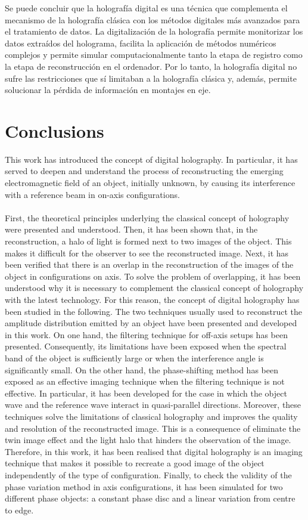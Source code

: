 \documentclass[12pt]{article}
\begin{document}
Se puede concluir que la holografía digital es una técnica   que complementa el mecanismo de la holografía clásica con los métodos  digitales más avanzados para el tratamiento de datos. La digitalización de la holografía  permite monitorizar los datos extraídos del holograma,   facilita la aplicación de  métodos numéricos complejos y permite simular computacionalmente tanto la etapa de registro como la etapa de reconstrucción en el ordenador. Por lo tanto, la holografía digital no sufre las restricciones que sí limitaban a la holografía clásica y, además, permite solucionar  la pérdida de información en montajes en eje.
\section*{Conclusions}
This work has introduced the concept of digital holography. In particular, it has served to deepen and understand the process of reconstructing the emerging electromagnetic field of an object, initially unknown, by causing its interference with a reference beam in on-axis configurations.\\ \\
First, the theoretical principles underlying the classical concept of holography were presented and understood. Then, it has been shown that, in the reconstruction, a halo of light is formed next to two images of the object. This makes it difficult for the observer to see the reconstructed image. Next, it has been verified that there is an overlap in the reconstruction of the images of the object in configurations on axis. To solve the problem of overlapping, it has been understood why it is necessary to complement the classical concept of holography with the latest technology. For this reason, the concept of digital holography has been studied in the following. The two techniques usually used to reconstruct the amplitude distribution emitted by an object have been presented and developed in this work. On one hand,  the filtering technique for off-axis setups has been presented. Consequently, its limitations have been exposed when the spectral band of the object is sufficiently large or when the interference angle is significantly small. On the other hand, the phase-shifting method has been exposed as an effective imaging technique when the filtering technique is not effective. In particular, it has been developed for the case in which the object wave and the reference wave interact  in quasi-parallel directions.  Moreover, these techniques solve the limitations of classical holography and improves the quality and resolution of the reconstructed image. This is a consequence of eliminate the twin image effect and the light halo that hinders the observation of the image. Therefore, in this work, it has been realised that digital holography is an imaging technique that makes it possible to recreate a good image of the object independently of the type of configuration. Finally, to check the validity of the phase variation method in axis configurations, it has been simulated for two different phase objects: a constant phase disc and a linear variation from centre to edge. \\ \\
\end{document}
